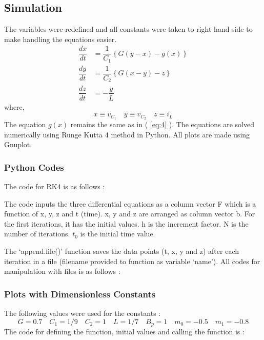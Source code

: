 \documentclass[12pt]{article}
\newcommand*{\myref}[1]{%
  \begingroup
    \hypersetup{
      linkcolor=linkequation,
      linkbordercolor=linkequation,
    }%
    \ref{#1}%
  \endgroup
}
\begin{document}
\subsection{Simulation}
The variables were redefined and all constants were taken to right hand side to make handling the equations easier.
\begin{align}
	\dfrac{dx}{dt}&=\dfrac{1}{C_1}\left\{ G\left( y-x \right)-g(x) \right\} \label{eq:5} \\
	\dfrac{dy}{dt}&=\dfrac{1}{C_2}\left\{ G\left( x-y \right)-z \right\} \label{eq:6} \\
	\dfrac{dz}{dt}&=-\dfrac{y}{L} \label{eq:7}
\end{align}
where,
\[ x \equiv v_{C_1} \quad y \equiv v_{C_2} \quad z \equiv i_L \]
The equation $g(x)$ remains the same as in (\myref{eq:4}).\linebreak
The equations are solved numerically using Runge Kutta 4 method in Python. All plots are made using Gnuplot.
%
\subsubsection{Python Codes}
The code for RK4 is as follows :

The code inputs the three differential equations as a column vector F which is a function of x, y, z and t (time). x, y and z are arranged as column vector b. For the first iterations, it has the initial values. 
h is the increment factor. N is the number of iterations. $t_0$ is the initial time value. \linebreak

The `append.file()' function saves the data points (t, x, y and z) after each iteration in a file (filename provided to function as variable `name'). All codes for manipulation with files is as follows :

%
\subsubsection{Plots with Dimensionless Constants}
The following values were used for the constants :
\[ G=0.7 \quad C_1=1/9 \quad C_2=1 \quad L=1/7 \quad B_p=1 \quad m_0=-0.5 \quad m_1=-0.8 \]
The code for defining the function, initial values and calling the function is :

\end{document}
